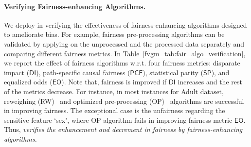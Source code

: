 \paragraph{Verifying Fairness-enhancing Algorithms.} We deploy {\fvgm} in verifying the effectiveness of fairness-enhancing algorithms designed to ameliorate bias. For example, fairness 
pre-processing algorithms can be validated by applying {\fvgm} on the unprocessed and the processed data separately and comparing different fairness metrics. In Table~\ref{fvgm_tab:fair_algo_verification}, we report the effect of fairness algorithms w.r.t. four fairness metrics: disparate impact ($ \mathsf{DI} $), path-specific causal fairness ($ \mathsf{PCF} $), statistical parity ($ \mathsf{SP} $), and equalized odds ($ \mathsf{EO} $). Note that, fairness is improved if $ \mathsf{DI} $ increases and the rest of the metrics decrease. For instance, in most instances for Adult dataset, reweighing (RW)~\cite{kamiran2012data} and optimized pre-processing (OP)~\cite{calmon2017optimized} algorithms are successful in improving fairness. The exceptional case is the unfairness regarding the sensitive feature `sex', where OP algorithm fails in improving fairness metric $ \mathsf{EO} $. Thus, \textit{{\fvgm} verifies the enhancement and decrement in fairness by  fairness-enhancing algorithms. }



